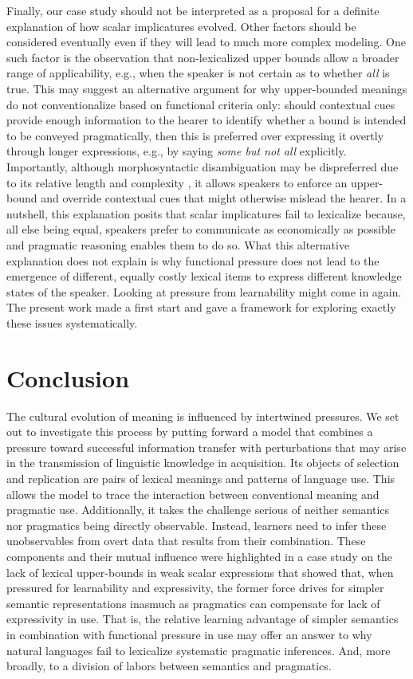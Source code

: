 \documentclass[a4paper, 11pt]{article}
\theoremstyle{Satz}
\begin{document}
Finally, our case study should not be interpreted as a proposal for a definite explanation of
how scalar implicatures evolved. Other factors should be considered eventually even if they
will lead to much more complex modeling. One such factor is the observation that
non-lexicalized upper bounds allow a broader range of applicability, e.g., when the speaker is
not certain as to whether \emph{all} is true. This may suggest an alternative argument for why
upper-bounded meanings do not conventionalize based on functional criteria only: should
contextual cues provide enough information to the hearer to identify whether a bound is
intended to be conveyed pragmatically, then this is preferred over expressing it overtly
through longer expressions, e.g., by saying {\em some but not all} explicitly. Importantly,
although morphosyntactic disambiguation may be dispreferred due to its relative length and
complexity \citep{piantadosi+etal:2012b}, it allows speakers to enforce an upper-bound and
override contextual cues that might otherwise mislead the hearer. In a nutshell, this
explanation posits that scalar implicatures fail to lexicalize because, all else being equal,
speakers prefer to communicate as economically as possible and pragmatic reasoning enables them
to do so. What this alternative explanation does not explain is why functional pressure does
not lead to the emergence of different, equally costly lexical items to express different
knowledge states of the speaker. Looking at pressure from learnability might come in again. The
present work made a first start and gave a framework for exploring exactly these issues
systematically.

\section{Conclusion}
The cultural evolution of meaning is influenced by intertwined pressures. We set out to
investigate this process by putting forward a model that combines a pressure toward successful
information transfer with perturbations that may arise in the transmission of linguistic
knowledge in acquisition. Its objects of selection and replication are pairs of lexical
meanings and patterns of language use. This allows the model to trace the interaction between
conventional meaning and pragmatic use. Additionally, it takes the challenge serious of neither
semantics nor pragmatics being directly observable. Instead, learners need to infer these
unobservables from overt data that results from their combination.  These components and their
mutual influence were highlighted in a case study on the lack of lexical upper-bounds in weak
scalar expressions that showed that, when pressured for learnability and expressivity, the
former force drives for simpler semantic representations inasmuch as pragmatics can compensate
for lack of expressivity in use. That is, the relative learning advantage of simpler semantics
in combination with functional pressure in use may offer an answer to why natural languages
fail to lexicalize systematic pragmatic inferences. And, more broadly, to a division of labors
between semantics and pragmatics.
\end{document}
